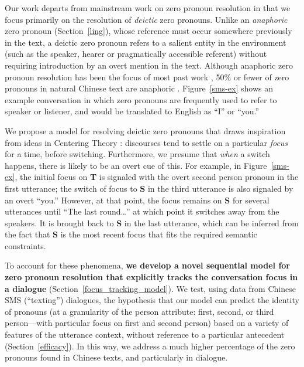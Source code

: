 \documentclass[11pt]{report}
\renewcommand\cite{\citep}	%
\newcommand{\speaker}[1]{{\bf\footnotesize\textsf{#1}}}
\begin{document}
Our work departs from mainstream work on zero pronoun resolution in that we focus primarily on the resolution of \emph{deictic} zero pronouns. Unlike an \emph{anaphoric} zero pronoun (Section~\ref{ling}), whose reference must occur somewhere previously in the text, a deictic zero pronoun refers to a salient entity in the environment (such as the speaker, hearer or pragmatically accessible referent) without requiring introduction by an overt mention in the text. Although anaphoric zero pronoun resolution has been the focus of most past work \cite{yeh2007zero,chenchinese}, 50\% or fewer of zero pronouns in natural Chinese text are anaphoric \cite{zhao2007identification,kong2010tree}. Figure~\ref{sms-ex} shows an example conversation in which zero pronouns are frequently used to refer to speaker or listener, and would be translated to English as ``I'' or ``you.''

We propose a model for resolving deictic zero pronouns that draws inspiration from ideas in Centering Theory \cite{grosz1995centering}: discourses tend to settle on a particular \emph{focus} for a time, before switching. Furthermore, we presume that \emph{when} a switch happens, there is likely to be an overt cue of this. For example, in Figure~\ref{sms-ex}, the initial focus on \speaker{T} is signaled with the overt second person pronoun in the first utterance; the switch of focus to \speaker{S} in the third utterance is also signaled by an overt ``you.'' However, at that point, the focus remains on \speaker{S} for several utterances until ``The last round\dots'' at which point it switches away from the speakers. It is brought back to \speaker{S} in the last utterance, which can be inferred from the fact that \speaker{S} is the most recent focus that fits the required semantic constraints.

To account for these phenomena, \textbf{we develop a novel sequential model for zero pronoun resolution that explicitly tracks the conversation focus in a dialogue} (Section~\ref{focus_tracking_model}). We test, using data from Chinese SMS (``texting'') dialogues, the hypothesis that our model can predict the identity of pronouns (at a granularity of the person attribute: first, second, or third person---with particular focus on first and second person) based on a variety of features of the utterance context, without reference to a particular antecedent (Section~\ref{efficacy}). In this way, we address a much higher percentage of the zero pronouns found in Chinese texts, and particularly in dialogue.
\end{document}
